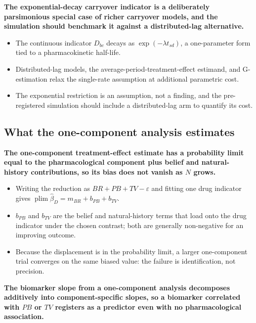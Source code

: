 \documentclass[
  11pt,
]{article}
\begin{document}
\textbf{The exponential-decay carryover indicator is a deliberately parsimonious special case of richer carryover models, and the simulation should benchmark it against a distributed-lag alternative.}

\begin{itemize}\setlength{\itemsep}{2pt}\setlength{\parskip}{0pt}
\item The continuous indicator $D_{bc}$ decays as $\exp(-\lambda t_{sd})$, a one-parameter form tied to a pharmacokinetic half-life.
\item Distributed-lag models, the average-period-treatment-effect estimand, and G-estimation relax the single-rate assumption at additional parametric cost.
\item The exponential restriction is an assumption, not a finding, and the pre-registered simulation should include a distributed-lag arm to quantify its cost.
\end{itemize}

\subsection{What the one-component analysis estimates}\label{what-the-one-component-analysis-estimates}

\textbf{The one-component treatment-effect estimate has a probability limit equal to the pharmacological component plus belief and natural-history contributions, so its bias does not vanish as $N$ grows.}

\begin{itemize}\setlength{\itemsep}{2pt}\setlength{\parskip}{0pt}
\item Writing the reduction as $BR + PB + TV - \varepsilon$ and fitting one drug indicator gives $\operatorname{plim}\hat\beta_D = m_{BR} + b_{PB} + b_{TV}$.
\item $b_{PB}$ and $b_{TV}$ are the belief and natural-history terms that load onto the drug indicator under the chosen contrast; both are generally non-negative for an improving outcome.
\item Because the displacement is in the probability limit, a larger one-component trial converges on the same biased value: the failure is identification, not precision.
\end{itemize}

\textbf{The biomarker slope from a one-component analysis decomposes additively into component-specific slopes, so a biomarker correlated with $PB$ or $TV$ registers as a predictor even with no pharmacological association.}
\end{document}
